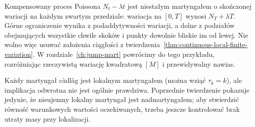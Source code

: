 \begin{uwaga}
Kompensowany proces Poissona $N_t-\lambda t$
jest niestałym martyngałem o skończonej
wariacji na każdym zwartym przedziale:
wariacja na $[0,T]$ wynosi $N_T+\lambda T$.
Górne ograniczenie wynika z podaddytywności
wariacji, a dolne z podziałów obejmujących
wszystkie chwile skoków i punkty dowolnie
bliskie im od lewej.
Nie wolno więc usuwać założenia ciągłości
z twierdzenia~\ref{thm:continuous-local-finite-variation}.
W rozdziale~\ref{ch:jump-mart} powrócimy do
tego przykładu, rozróżniając rzeczywistą
wariację kwadratową $[M]$ i przewidywalny nawias.
\end{uwaga}

\begin{uwaga}
Każdy martyngał c\`adl\`ag jest lokalnym martyngałem
(można wziąć $\tau_k=k$), ale implikacja odwrotna nie jest
ogólnie prawdziwa. Poprzednie twierdzenie pokazuje jedynie,
że nieujemny lokalny martyngał jest nadmartyngałem;
aby stwierdzić równość warunkowych wartości oczekiwanych,
trzeba jeszcze kontrolować brak utraty masy przy lokalizacji.
\end{uwaga}


